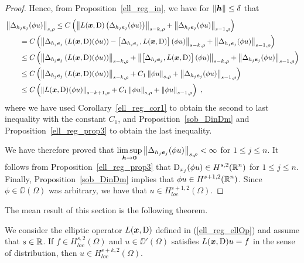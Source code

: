 \begin{proof}
Hence, from Proposition~\ref{ell_reg_in}, we have for $\|{\bm{h}}\| \leq \delta$
that
\begin{align*}
&\left\| \Delta_{h_j{\bm{e}}_j} (\phi u) \right\|_{s,\rho}
\leq C \left( \left\| L({\bm{x}},\operatorname{D}) \left(\Delta_{h_j{\bm{e}}_j}
(\phi u)\right) \right\|_{s-k,\rho}
+ \left\|\Delta_{h_j{\bm{e}}_j} (\phi u)\right\|_{s-1,\rho} \right) \\
&\qquad = C \left( \left\| \Delta_{h_j{\bm{e}}_j}\left(L({\bm{x}},\operatorname{D})
(\phi u)\right) - \left[\Delta_{h_j{\bm{e}}_j} , L({\bm{x}},\operatorname{D})\right]
(\phi u) \right\|_{s-k,\rho}
+ \left\|\Delta_{h_j{\bm{e}}_j} (\phi u)\right\|_{s-1,\rho} \right) \\
&\qquad \leq C \left( \left\| \Delta_{h_j{\bm{e}}_j}\left(L({\bm{x}},\operatorname{D})
(\phi u)\right)\right\|_{s-k,\rho}
+ \left\| \left[\Delta_{h_j{\bm{e}}_j} , L({\bm{x}},\operatorname{D})\right]
(\phi u) \right\|_{s-k,\rho}
+ \left\|\Delta_{h_j{\bm{e}}_j} (\phi u)\right\|_{s-1,\rho} \right) \\
&\qquad \leq C \left( \left\| \Delta_{h_j{\bm{e}}_j}\left(L({\bm{x}},\operatorname{D})
(\phi u)\right)\right\|_{s-k,\rho} + C_1\left\| \phi u \right\|_{s,\rho}
+ \left\|\Delta_{h_j{\bm{e}}_j} (\phi u )\right\|_{s-1,\rho} \right) \\
&\qquad \leq C \left( \left\| L({\bm{x}},\operatorname{D}) (\phi u) \right\|_{s-k+1,\rho}
+ C_1\left\| \phi u \right\|_{s,\rho}
+ \left\|\phi u\right\|_{s-1,\rho} \right) \ ,
\end{align*}
where we have used Corollary~\ref{ell_reg_cor1} to obtain the second
to last inequality with the constant $C_1$, and
Proposition~\ref{sob_DinDm} and Proposition~\ref{ell_reg_prop3}
to obtain the last inequality.

We have therefore proved that
$\displaystyle \limsup_{{\bm{h}}\rightarrow {\bm{0}}} \left\| \Delta_{h_j{\bm{e}}_j}
(\phi u)\right\|_{s,\rho} < \infty$
for $1\leq j \leq n$.  It follows from Proposition~\ref{ell_reg_prop3} that
$\displaystyle \operatorname{D}_{x_j} (\phi u) \in H^{s,2}(\mathbb{R}^n)$
for $1\leq j \leq n$.  Finally, Proposition~\ref{sob_DinDm} implies that
$\displaystyle \phi u \in H^{s+1,2}(\mathbb{R}^n)$.  Since $\phi \in \DD(\Omega)$
was arbitrary, we have that $\displaystyle u \in H^{s+1,2}_{loc}(\Omega)$.
\end{proof}

The mean result of this section is the following theorem.

\begin{theorem} \label{ell_int_regTH}
We consider the elliptic operator $L({\bm{x}},\operatorname{D})$ defined in
(\ref{ell_reg_ellOp}) and assume that $s \in \mathbb{R}$.  If
$\displaystyle f \in H^{s,2}_{loc}(\Omega)$ and $u \in \DD'(\Omega)$ satisfies
$L({\bm{x}},\operatorname{D}) u=f$ in the sense of distribution,
then $\displaystyle u\in H^{s+k,2}_{loc}(\Omega)$.
\end{theorem}

